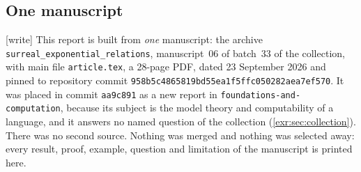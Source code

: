 \documentclass[11pt,letterpaper]{article}
\numberwithin{equation}{section}
\theoremstyle{definition}
\theoremstyle{remark}
\newcommand{\repoSHA}{\nolinkurl{958b5c4865819bd55ea1f5ffc050282aea7ef570}}
\newcommand{\rpath}[1]{\nolinkurl{#1}}%
\newcommand{\wtag}{\textup{[write]}}%
\begin{document}
\subsection{One manuscript}\label{exr:app:onesource}

\wtag{} This report is built from \emph{one} manuscript: the archive
\texttt{surreal\_exponential\_relations}, manuscript~06 of batch~33 of the
collection, with main file \texttt{article.tex}, a 28-page PDF, dated
23 September 2026 and pinned to repository commit \repoSHA. It was placed in
commit \nolinkurl{aa9c891} as a new report in
\rpath{foundations-and-computation}, because its subject is the model theory
and computability of a language, and it answers no named question of the
collection (\cref{exr:sec:collection}). There was no second source. Nothing
was merged and nothing was selected away: every result, proof, example,
question and limitation of the manuscript is printed here.
\end{document}
